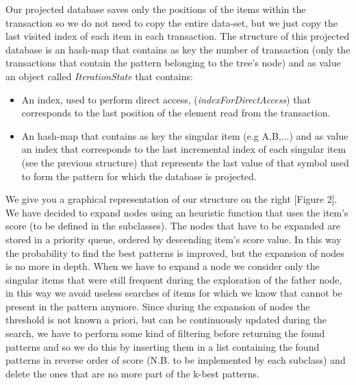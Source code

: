 \documentclass[10pt, a4paper]{article}
\begin{document}
	\newline
	Our projected database saves only the positions of the items within the transaction so we do not need to copy the entire data-set, but we just copy the last visited index of each item in each transaction. 
	The structure of this projected database is an hash-map that contains as key the number of transaction (only the transactions that contain the pattern belonging to the tree's node) and as value an object called \textit{IterationState} that contains:
	\begin{itemize}
		\item An index, used to perform direct access, (\textit{indexForDirectAccess}) that corresponds to the last position of the element read from the transaction.
		\item An hash-map that contains as key the singular item (e.g A,B,...) and as value an index that corresponds to the last incremental index of each singular item (see the previous structure) that represents the last value of that symbol used to form the pattern for which the database is projected.
	\end{itemize}
	We give you a graphical representation of our structure on the right [Figure 2].\newline
	\noindent
	We have decided to expand nodes using an heuristic function that uses the item's score (to be defined in the subclasses). The nodes that have to be expanded are stored in a priority queue, ordered by descending item's score value. In this way the probability to find the best patterns is improved, but the expansion of nodes is no more in depth.\newline
	When we have to expand a node we consider only the singular items that were still frequent during the exploration of the father node, in this way we avoid useless searches of items for which we know that cannot be present in the pattern anymore.
	\newline\newline
	Since during the expansion of nodes the threshold is not known a priori, but can be continuously updated during the search, we have to perform some kind of filtering before returning the found patterns and so we do this by inserting them in a list containing the found patterns in reverse order of score (N.B. to be implemented by each subclass) and delete the ones that are no more part of the k-best patterns.
\end{document}
